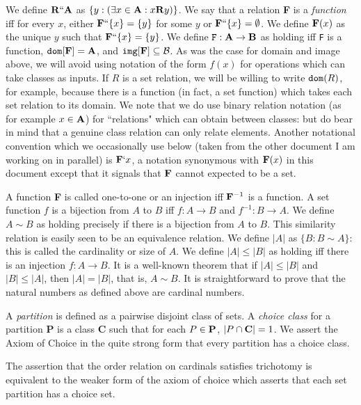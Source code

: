 \documentclass[12pt]{article}
\begin{document}
We define ${\bf R}``{\bf A}$ as $\{y:(\exists x \in {\bf A}:x {\bf R} y)\}$.  We say that a relation {\bf F} is a {\em function\/} iff for every $x$, either ${\bf F}``\{x\} = \{y\}$ for some
$y$ or ${\bf F}``\{x\} = \emptyset$.  We define ${\bf F}(x)$ as the unique $y$ such that ${\bf F}``\{x\} = \{y\}$.  We define ${\tt F}:{\bf A} \rightarrow {\bf B}$ as holding iff {\tt F} is a function, ${\tt dom}[{\bf F}] = {\bf A}$, and ${\tt img}[{\bf F}] \subseteq {\cal B}$.  As was the case for domain and image above, we will
avoid using notation of the form $f(x)$ for operations which can take classes as inputs.  If $R$ is a set relation, we will be willing to write ${\tt dom}(R)$, for example, because
there is a function (in fact, a set function) which takes each set relation to its domain.  We note that we do use binary relation notation (as for example $x \in {\bf A}$) for ``relations" which can obtain between classes:  but do bear in mind that a genuine class relation can only relate elements.  Another notational convention which we occasionally use below (taken from the other document I am working on in parallel) is ${\bf F}`x$, a notation synonymous with ${\bf F}(x)$ in this document except that it signals that ${\bf F}$ cannot expected to be a set.

A function {\bf F} is called one-to-one or an injection iff ${\bf F}^{-1}$ is a function.  A set function $f$ is a bijection from $A$ to $B$ iff $f:A \rightarrow B$ and $f^{-1}:B \rightarrow A$.
We define $A \sim B$ as holding precisely if there is a bijection from $A$ to $B$.  This similarity relation is easily seen to be an equivalence relation.  We define
$|A|$ as $\{B:B \sim A\}$:  this is called the cardinality or size of $A$.  We define $|A| \leq |B|$ as holding iff there is an injection $f:A \rightarrow B$.  It is a well-known theorem that
if $|A| \leq |B|$ and $|B| \leq |A|$, then $|A| = |B|$, that is, $A \sim B$.  It is straightforward to prove that the natural numbers as defined above are cardinal numbers.

A {\em partition\/} is defined as a pairwise disjoint class of sets.  A {\em choice class\/} for a partition {\bf P}  is a class {\bf C} such that for each $P \in {\bf P}$, $|P \cap {\bf C}|=1$.  We assert the Axiom of Choice in the quite strong form that every
partition has a choice class.

The assertion that the order relation on cardinals satisfies trichotomy is equivalent to the weaker form of the axiom of choice which asserts that each set partition has a choice set.
\end{document}
